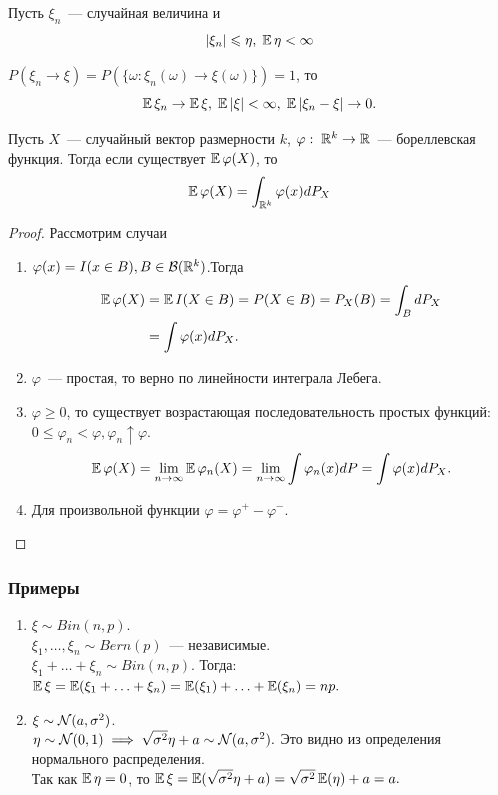 \begin{theorem}
Пусть $\xi_n$~--- случайная величина и
\[|\xi_n| \leqslant \eta,\; \operatorname{\mathbb{E}}\eta < \infty\]

 \(P(\xi_n \to \xi) = P(\{\omega: \xi_n(\omega) \to  \xi(\omega)\}) = 1\), то
\[\operatorname{\mathbb{E}}\xi_n \to \operatorname{\mathbb{E}}\xi,\; \operatorname{\mathbb{E}}|\xi| < \infty,\; \operatorname{\mathbb{E}}|\xi_n - \xi| \to 0.\]
\end{theorem}

\begin{theorem}
Пусть $X$~--- случайный вектор размерности $k$, $\varphi:\; \mathbb{R}^k \rightarrow \mathbb{R}$~--- бореллевская функция. Тогда если существует $\operatorname{\mathbb{E}}\varphi(X)$, то
\[
    \operatorname{\mathbb{E}}\varphi(X) = \int_{\mathbb{R}^k}\varphi(x) dP_X
\]
\end{theorem}
\begin{proof}
Рассмотрим случаи
\begin{enumerate}
    \item $\varphi(x) = I(x \in B), B \in \mathcal{B}(\mathbb{R}^k)$.Тогда
    \begin{align*}
        \operatorname{\mathbb{E}}\varphi(X) &= \operatorname{\mathbb{E}} I(X \in B) = P(X \in B) = P_X(B) = \int_B dP_X\\
        &= \int \varphi(x) dP_X.
    \end{align*}
    \item $\varphi$~--- простая, то верно по линейности интеграла Лебега.
    \item $\varphi \geqslant 0$, то существует возрастающая последовательность простых функций: \\$
    0 \leqslant \varphi_n < \varphi, \varphi_n \uparrow \varphi$.
    \begin{align*}
        \operatorname{\mathbb{E}}\varphi(X) = \lim_{n \to \infty}\operatorname{\mathbb{E}}\varphi_n(X) = 
         \lim_{n \to \infty}\int\varphi_n(x)dP = \int\varphi(x) dP_X.
    \end{align*}
    \item Для произвольной функции $\varphi = \varphi^+ - \varphi^-$.
\end{enumerate}
\end{proof}

\subsubsection*{Примеры}
\begin{enumerate}
    \item $\xi \sim Bin(n, p)$.\\
    $\xi_1, \ldots, \xi_n \sim Bern(p)$~--- независимые.\\
    $\xi_1 + \ldots + \xi_n \sim Bin(n, p)$. Тогда:\\
    $\operatorname{\mathbb{E}}\xi = \operatorname{\mathbb{E}}(\xi_1 + \ldots + \xi_n) = \operatorname{\mathbb{E}}(\xi_1) + \ldots + \operatorname{\mathbb{E}}(\xi_n) = np.$
    \item $\xi \sim \mathcal{N}(a, \sigma^2)$.\\
    $\eta \sim \mathcal{N}(0, 1) \implies \sqrt{\sigma^2}\eta + a \sim \mathcal{N}(a, \sigma^2).$ Это видно из определения нормального распределения.\\
    Так как $\operatorname{\mathbb{E}}\eta = 0$, то $\operatorname{\mathbb{E}}\xi = \operatorname{\mathbb{E}}(\sqrt{\sigma^2}\eta + a) = \sqrt{\sigma^2}\operatorname{\mathbb{E}}(\eta) + a = a.$
\end{enumerate}